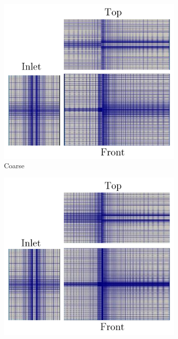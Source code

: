 \documentclass[oneside]{utmthesis}
\begin{document}
\begin{figure}
  \centering
  \begin{subfigure}[h]{0.3\textwidth}
    \includegraphics[width=\textwidth]{figs/figure6a}
    \caption{Coarse}
    \label{fig:coarseMesh}
  \end{subfigure}
  \hfill
  \begin{subfigure}[h]{0.3\textwidth}
    \includegraphics[width=\textwidth]{figs/figure6b}

\end{subfigure}
\end{figure}
\end{document}
